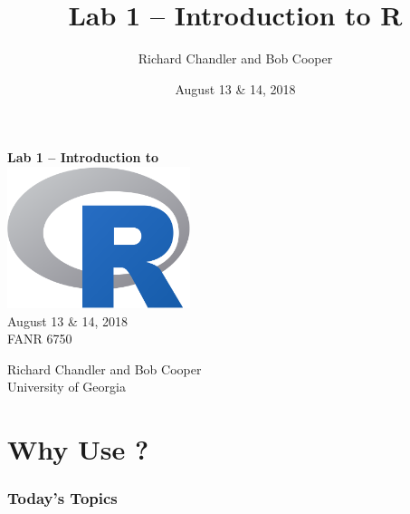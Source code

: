 \documentclass[color=usenames,dvipsnames]{beamer}\usepackage[]{graphicx}\usepackage[]{color}
\title{Lab 1 -- Introduction to {\bf R}}
\author{Richard Chandler and Bob Cooper}
\date{August 13 \& 14, 2018}
\begin{document}



\begin{frame}[plain]
  \LARGE
  {\centering
  {\huge \bf Lab 1 -- Introduction to \R} \\
  \vspace{0.9cm}
  \includegraphics[width=0.4\textwidth]{figs/Rlogo} \\
  \vspace{0.5cm}
  August 13 \& 14, 2018 \\
  FANR 6750 \par
  \vfill
  \large
  Richard Chandler and Bob Cooper \\
  University of Georgia \\
  }
\end{frame}




\section{Why Use \R?}


\begin{frame}[plain]
  \frametitle{Today's Topics}
  \Large
\end{frame}
\end{document}
